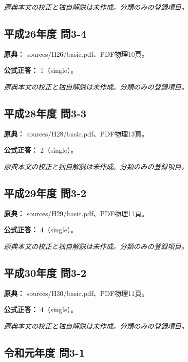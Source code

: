 \par\textit{原典本文の校正と独自解説は未作成。分類のみの登録項目。}

\subsection{平成26年度 問3-4}
\label{q:h26-reg-basic-3-4}

\noindent\textbf{原典：} sources/H26/basic.pdf、PDF物理10頁。

\textbf{公式正答：} 1（single）。

\par\textit{原典本文の校正と独自解説は未作成。分類のみの登録項目。}

\subsection{平成28年度 問3-3}
\label{q:h28-reg-basic-3-3}

\noindent\textbf{原典：} sources/H28/basic.pdf、PDF物理13頁。

\textbf{公式正答：} 2（single）。

\par\textit{原典本文の校正と独自解説は未作成。分類のみの登録項目。}

\subsection{平成29年度 問3-2}
\label{q:h29-reg-basic-3-2}

\noindent\textbf{原典：} sources/H29/basic.pdf、PDF物理11頁。

\textbf{公式正答：} 4（single）。

\par\textit{原典本文の校正と独自解説は未作成。分類のみの登録項目。}

\subsection{平成30年度 問3-2}
\label{q:h30-reg-basic-3-2}

\noindent\textbf{原典：} sources/H30/basic.pdf、PDF物理11頁。

\textbf{公式正答：} 4（single）。

\par\textit{原典本文の校正と独自解説は未作成。分類のみの登録項目。}

\subsection{令和元年度 問3-1}
\label{q:r01-reg-basic-3-1}

